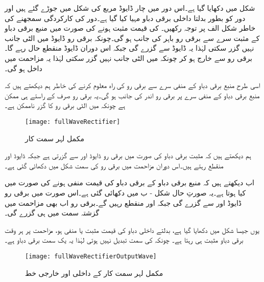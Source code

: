 

شکل  میں  دکھایا گیا ہے۔اس دور میں چار ڈایوڈ مربع کی شکل میں جوڑے گئے ہیں اور دور کو  بطور بدلتا داخلی برقی دباو مہیا کیا گیا ہے۔دور کی کارکردگی سمجھنے کی خاطر شکل  الف  پر توجہ رکھیں۔ کی قیمت مثبت ہونے کی صورت میں منبع برقی دباو کے مثبت   سرے سے برقی رو باہر کی جانب ہو گی۔چونکہ برقی رو ڈایوڈ میں الٹی جانب نہیں گزر سکتی لہٰذا یہ ڈایوڈ  سے گزرے گی جبکہ اس دوران ڈایوڈ  منقطع حال رہے گا۔برقی رو  سے خارج ہو کر چونکہ  میں الٹی جانب نہیں گزر سکتی لہٰذا یہ مزاحمت  میں داخل ہو گی۔

اسی طرح منبع برقی دباو کے منفی سرے سے برقی رو کی راہ معلوم کرنے کی خاطر ہم دیکھتے ہیں کہ منبع برقی دباو کے منفی  سرے پر برقی رو اندر کی جانب ہو گی۔یہ برقی رو صرف  کے راستے ہی ممکن ہے چونکہ  میں الٹی برقی رو کا گزر ناممکن ہے۔
\begin{figure}
\centering
\texttt{[image: fullWaveRectifier]}
\caption{مکمل لہر سمت کار}
\label{شکل_مکمل_لہر_سمت_کار}
\end{figure}
ہم دیکھتے ہیں کہ مثبت برقی دباو کی صورت میں برقی رو ڈایوڈ   اور   سے گزرتی ہے جبکہ ڈایوڈ   اور   منقطع رہتے ہیں۔اس دوران مزاحمت میں برقی رو کی سمت شکل میں دکھائی گئی ہے۔

اب دیکھتے ہیں کہ منبع برقی دباو کے برقی دباو کی قیمت منفی ہونے کی صورت میں کیا ہوتا ہے۔یہ صورتِ حال شکل  - ب میں دکھائی گئی ہے۔اس صورت میں برقی رو ڈایوڈ   اور  سے گزرے گی جبکہ   اور   منقطع رہیں گے۔برقی رو اب بھی مزاحمت میں گزشتہ سمت میں ہی گزرے گی۔

یوں جیسا شکل   میں دکھایا گیا ہے، بدلتے داخلی دباو  کی قیمت مثبت یا منفی ہو، مزاحمت پر ہر وقت برقی دباو مثبت ہی رہتا ہے۔ چونکہ  کی سمت تبدیل نہیں ہوتی لہٰذا یہ یک سمت برقی دباو ہے۔
\begin{figure}
\centering
\texttt{[image: fullWaveRectifierOutputWave]}
\caption{مکمل لہر سمت کار کے داخلی اور خارجی خط}
\label{شکل_مکمل_لہر_سمت_کار_کے_خط}
\end{figure}

